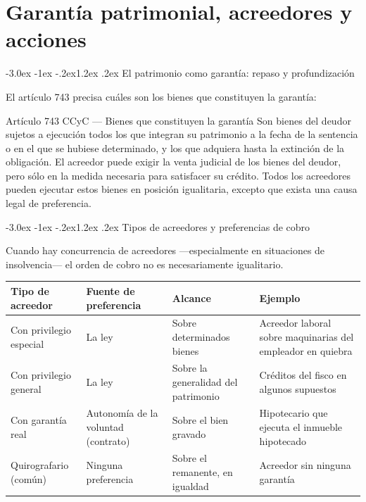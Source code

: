 \documentclass[12pt,oneside]{book}
\makeatletter
\renewcommand\section{\@startsection{section}{1}{\z@}%
  {-3.0ex \@plus -1ex \@minus -.2ex}{1.2ex \@plus .2ex}%
  {\normalfont\large\bfseries\color{acento}}}
\newenvironment{tabla}{%
    \par\medskip\begingroup\small\renewcommand{\arraystretch}{1.3}\noindent\ignorespaces
}{%
    \par\endgroup\medskip
}
\makeatother
\begin{document}

\chapter{Garantía patrimonial, acreedores y acciones}
\label{ch:garantia}

\section{El patrimonio como garantía: repaso y profundización}

El artículo 743 precisa cuáles son los bienes que constituyen la garantía:

\begin{norma}{Artículo 743 CCyC --- Bienes que constituyen la garantía}
Son bienes del deudor sujetos a ejecución todos los que integran su patrimonio a la fecha de la sentencia o en el que se hubiese determinado, y los que adquiera hasta la extinción de la obligación. El acreedor puede exigir la venta judicial de los bienes del deudor, pero sólo en la medida necesaria para satisfacer su crédito. Todos los acreedores pueden ejecutar estos bienes en posición igualitaria, excepto que exista una causa legal de preferencia.
\end{norma}

\section{Tipos de acreedores y preferencias de cobro}

Cuando hay concurrencia de acreedores ---especialmente en situaciones de insolvencia--- el orden de cobro no es necesariamente igualitario.

\begin{tabla}
\begin{tabularx}{\textwidth}{B{2.7cm}YYY}
\toprule
Tipo de acreedor & \textbf{Fuente de preferencia} & \textbf{Alcance} & \textbf{Ejemplo} \\
\midrule
Con privilegio especial & La ley & Sobre determinados bienes & Acreedor laboral sobre maquinarias del empleador en quiebra \\
Con privilegio general & La ley & Sobre la generalidad del patrimonio & Créditos del fisco en algunos supuestos \\
Con garantía real & Autonomía de la voluntad (contrato) & Sobre el bien gravado & Hipotecario que ejecuta el inmueble hipotecado \\
Quirografario (común) & Ninguna preferencia & Sobre el remanente, en igualdad & Acreedor sin ninguna garantía \\
\bottomrule
\end{tabularx}
\end{tabla}
\end{document}
